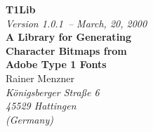 \documentclass[11pt]{article}
\def\libversion{1.0.1}\relax
\def\libdate{March, 20, 2000}\relax
\begin{document}
\thispagestyle{empty}
\begin{center}
\leavevmode
\vskip2cm
{\Huge\bfseries T1Lib}\\[3mm]

{\Large\sl Version \libversion\ --  \libdate}\\[2.5cm]

{\LARGE\bf A Library for Generating}\\[5mm]
{\LARGE\bf Character Bitmaps from}\\[5mm]
{\LARGE\bf Adobe Type 1 Fonts}\\[2cm]
{\Large\sc Rainer Menzner}\\[2mm]
{\Large\sl K\"onigsberger Stra\ss e 6\\[2mm]
45529 Hattingen\\[1cm]
(Germany)}\\[1cm]
\end{center}
\newpage
\tableofcontents







\def\indexname{Function Index\addcontentsline{toc}{section}{\hskip1emFunction Index}}%
\printindex
\end{document}
